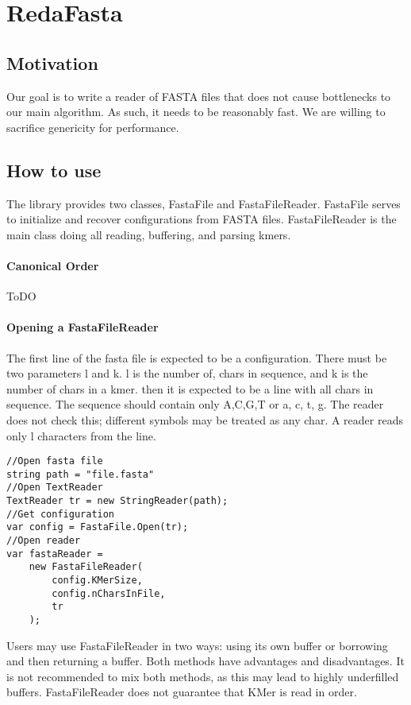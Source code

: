 \chapter{RedaFasta}
\section{Motivation}
Our goal is to write a reader of FASTA files that does not cause bottlenecks to our main algorithm. As such, it needs to be reasonably fast. We are willing to sacrifice genericity for performance. 
\section{How to use}
The library provides two classes, FastaFile and FastaFileReader. FastaFile serves to initialize and recover configurations from FASTA files. FastaFileReader is the main class doing all reading, buffering, and parsing kmers.

\subsubsection{Canonical Order}
ToDO

\subsubsection{Opening a FastaFileReader}
The first line of the fasta file is expected to be a configuration. There must be two parameters
l and k. l is the number of, chars in sequence, and k is the number of chars in a kmer.
then it is expected to be a line with all chars in sequence. The sequence should contain only A,C,G,T or a, c, t, g. The reader does not check this; different symbols may be treated as any char. A reader reads only l characters from the line.

\begin{lstlisting}
//Open fasta file
string path = "file.fasta"
//Open TextReader
TextReader tr = new StringReader(path);
//Get configuration
var config = FastaFile.Open(tr);
//Open reader
var fastaReader = 
    new FastaFileReader(
        config.KMerSize, 
        config.nCharsInFile, 
        tr
    );
\end{lstlisting}
Users may use FastaFileReader in two ways: using its own buffer or borrowing and then returning a buffer. Both methods have advantages and disadvantages. It is not recommended to mix both methods, as this may lead to highly underfilled buffers. FastaFileReader does not guarantee that KMer is read in order.
